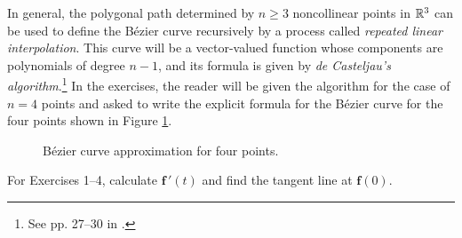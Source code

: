 \begin{exmp}
 In general, the polygonal path determined by $n \ge 3$ noncollinear points in $\mathbb{R}^{3}$ can be used to define
 the B\'{e}zier curve recursively by a process called \emph{repeated linear interpolation}. This curve will be a
 vector-valued function whose components are polynomials of degree $n-1$, and its formula is given by
 \emph{de Casteljau's algorithm}.\footnote{See pp. 27--30 in \cite{far}.} In the exercises, the reader will be given the
 algorithm for the case of $n = 4$ points and asked to write the explicit formula for the B\'{e}zier curve for the four
 points shown in Figure \ref{fig:bezier3}.\vspace{-0mm}
 \begin{figure}[h]
  \begin{center}
   
  \end{center}\vspace{-0mm}
 \caption[]{\quad B\'{e}zier curve approximation for four points.}
 \label{fig:bezier3}
 \end{figure}
\end{exmp}\vspace{-0mm}
\startexercises\label{sec1dot8}
\par\noindent For Exercises 1--4, calculate $\textbf{f}\,'(t)$ and find the tangent line at $\textbf{f}(0)$.
